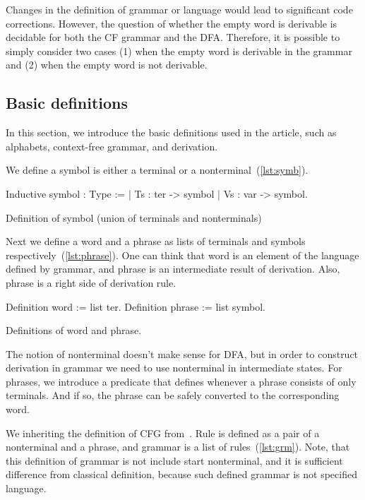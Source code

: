 Changes in the definition of grammar or language would lead to significant code corrections. However, the question of whether the empty word is derivable is decidable for both the CF grammar and the DFA. Therefore, it is possible to simply consider two cases (1) when the empty word is derivable in the grammar and (2) when the empty word is not derivable.

\subsection{Basic definitions}

In this section, we introduce the basic definitions used in the article, such as alphabets, context-free grammar, and derivation.

We define a symbol is either a terminal or a nonterminal~(\ref{lst:symb}).

\begin{listing}[h]
    \begin{pyglist}[language=coq, numbers=none, numbersep=5pt]
  Inductive symbol : Type :=
    | Ts : ter -> symbol
    | Vs : var -> symbol.
    \end{pyglist}
    \caption{Definition of symbol (union of terminals and nonterminals)}
    \label{lst:symb}
\end{listing}

Next we define a word and a phrase as lists of terminals and symbols respectively~(\ref{lst:phrase}).
One can think that word is an element of the language defined by grammar, and phrase is an intermediate result of derivation.
Also, phrase is a right side of derivation rule.

\begin{listing}[h]
    \begin{pyglist}[language=coq, numbers=none, numbersep=5pt]
  Definition word := list ter.
  Definition phrase := list symbol.
    \end{pyglist}
    \caption{Definitions of word and phrase.}
    \label{lst:phrase}
\end{listing}

The notion of nonterminal doesn't make sense for DFA, but in order to construct derivation in grammar we need to use nonterminal in intermediate states. For phrases, we introduce a predicate that defines whenever a phrase consists of only terminals. And if so, the phrase can be safely converted to the corresponding word.

We inheriting the definition of CFG from~\cite{smolkaHofmann2016}. Rule is defined as a pair of a nonterminal and a phrase, and grammar is a list of rules~(\ref{lst:grm}).
Note, that this definition of grammar is not include start nonterminal, and it is sufficient difference from classical definition, because such defined grammar is not specified language.

